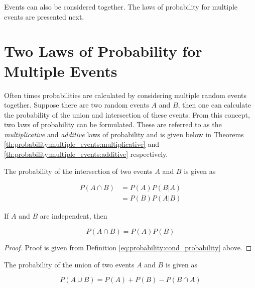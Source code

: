 Events can also be considered together. The laws of probability for multiple events are presented next.

\section{Two Laws of Probability for Multiple Events}
\label{sec:probability:multiple_events}

Often times probabilities are calculated by considering multiple random events together. Suppose there are two random events $A$ and $B$, then one can calculate the probability of the union and intersection of these events. From this concept, two laws of probability can be formulated. These are referred to as the \textit{multiplicative} and \textit{additive} laws of probability \cite{ref:wackerly:2014} and is given below in Theorems \ref{th:probability:multiple_events:multiplicative} and \ref{th:probability:multiple_events:additive} respectively.

\begin{theorem}
    \label{th:probability:multiple_events:multiplicative}
    The probability of the intersection of two events $A$ and $B$ is given as
    
    \begin{equation*}
        \begin{split}
            P(A \cap B)
            &= P(A)P(B \vert A) \\
            &= P(B)P(A \vert B)
        \end{split}
    \end{equation*}
    
    If $A$ and $B$ are independent, then
    
    \begin{equation*}
        P(A \cap B) = P(A)P(B)
    \end{equation*}
\end{theorem}

\begin{proof}
    Proof is given from Definition \ref{eq:probability:cond_probability} above.
\end{proof}

\begin{theorem}
    \label{th:probability:multiple_events:additive}
    The probability of the union of two events $A$ and $B$ is given as
    
    \begin{equation*}
        P(A \cup B) = P(A) + P(B) - P(B \cap A)
    \end{equation*}
\end{theorem}

